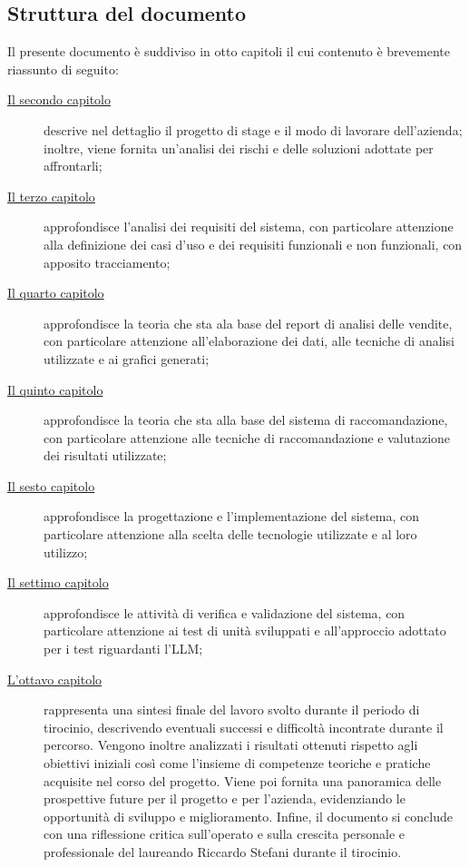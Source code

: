 \subsection{Struttura del documento}
\label{sec:organizzazione-testo}
Il presente documento è suddiviso in otto capitoli il cui contenuto è brevemente riassunto di seguito:

\begin{description}
    \item[{\hyperref[cap:descrizione-stage]{Il secondo capitolo}}] descrive nel dettaglio il progetto di stage e il modo di lavorare dell'azienda; inoltre, viene fornita un'analisi dei rischi e delle soluzioni adottate per affrontarli;
    
    \item[{\hyperref[cap:analisi-requisiti]{Il terzo capitolo}}] approfondisce l'analisi dei requisiti del sistema, con particolare attenzione alla definizione dei casi d'uso e dei requisiti funzionali e non funzionali, con apposito tracciamento;
    
    \item[{\hyperref[cap:report-vendite]{Il quarto capitolo}}] approfondisce la teoria che sta ala base del report di analisi delle vendite, con particolare attenzione all'elaborazione dei dati, alle tecniche di analisi utilizzate e ai grafici generati;
    
    \item[{\hyperref[cap:sistema-raccomandazione]{Il quinto capitolo}}] approfondisce la teoria che sta alla base del sistema di raccomandazione, con particolare attenzione alle tecniche di raccomandazione e valutazione dei risultati utilizzate;
    
    \item[{\hyperref[cap:progettazione-implementazione]{Il sesto capitolo}}] approfondisce la progettazione e l'implementazione del sistema, con particolare attenzione alla scelta delle tecnologie utilizzate e al loro utilizzo;
    
    \item[{\hyperref[cap:verifica-validazione]{Il settimo capitolo}}] approfondisce le attività di verifica e validazione del sistema, con particolare attenzione ai test di unità sviluppati e all'approccio adottato per i test riguardanti l'LLM;
    
    \item[{\hyperref[cap:conclusioni]{L'ottavo capitolo}}] rappresenta una sintesi finale del lavoro svolto durante il periodo di tirocinio, descrivendo eventuali successi e difficoltà incontrate durante il percorso. Vengono inoltre analizzati i risultati ottenuti rispetto agli obiettivi iniziali così come l’insieme di competenze teoriche e pratiche acquisite nel corso del progetto. Viene poi fornita una panoramica delle prospettive future per il progetto e per l'azienda, evidenziando le opportunità di sviluppo e miglioramento. Infine, il documento si conclude con una riflessione critica sull’operato e sulla crescita personale e professionale del laureando Riccardo Stefani durante il tirocinio.

\end{description}

